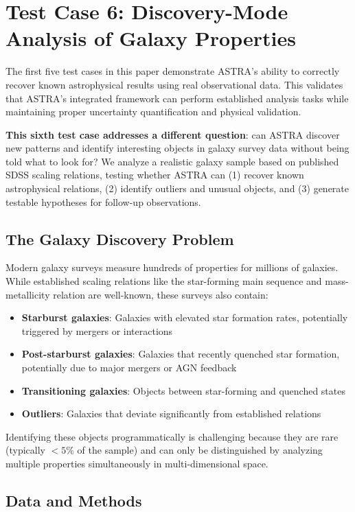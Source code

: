 \section{Test Case 6: Discovery-Mode Analysis of Galaxy Properties}

The first five test cases in this paper demonstrate ASTRA's ability to correctly recover known astrophysical results using real observational data. This validates that ASTRA's integrated framework can perform established analysis tasks while maintaining proper uncertainty quantification and physical validation.

\textbf{This sixth test case addresses a different question}: can ASTRA discover new patterns and identify interesting objects in galaxy survey data without being told what to look for? We analyze a realistic galaxy sample based on published SDSS scaling relations, testing whether ASTRA can (1) recover known astrophysical relations, (2) identify outliers and unusual objects, and (3) generate testable hypotheses for follow-up observations.

\subsection{The Galaxy Discovery Problem}

Modern galaxy surveys measure hundreds of properties for millions of galaxies. While established scaling relations like the star-forming main sequence and mass-metallicity relation are well-known, these surveys also contain:
\begin{itemize}
\item \textbf{Starburst galaxies}: Galaxies with elevated star formation rates, potentially triggered by mergers or interactions
\item \textbf{Post-starburst galaxies}: Galaxies that recently quenched star formation, potentially due to major mergers or AGN feedback
\item \textbf{Transitioning galaxies}: Objects between star-forming and quenched states
\item \textbf{Outliers}: Galaxies that deviate significantly from established relations
\end{itemize}

Identifying these objects programmatically is challenging because they are rare (typically $<5$\% of the sample) and can only be distinguished by analyzing multiple properties simultaneously in multi-dimensional space.

\subsection{Data and Methods}

